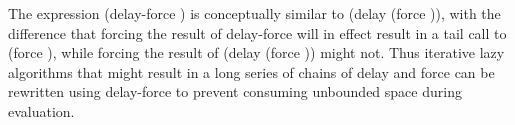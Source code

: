 \begin{entry}{%
}


\semantics
The expression {\cf (delay-force )} is conceptually similar to 
{\cf (delay (force ))},
with the difference that forcing the result
of {\cf delay-force} will in effect result in a tail call to 
{\cf (force )},
while forcing the result of
{\cf (delay (force ))}
might not.  Thus
iterative lazy algorithms that might result in a long series of chains of
{\cf delay} and {\cf force}
can be rewritten using {\cf delay-force} to prevent consuming
unbounded space during evaluation.

\end{entry}

